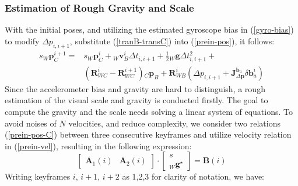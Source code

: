 \documentclass[journal,article,submit,moreauthors,pdftex]{Definitions/mdpi}
\begin{document}
\subsubsection{Estimation of Rough Gravity and Scale}
With the initial poses, and utilizing the estimated gyroscope bias in 
(\ref{gyro-bias}) to modify $\Delta{p}_{i,i+1}$, substitute 
(\ref{tranB-transC}) into (\ref{prein-pos}), it follows:
\begin{equation}
	\begin{aligned}
		s{_W}\boldsymbol{p}_C^{i+1} = & s{_W}\boldsymbol{p}_C^{i} + {_W}\boldsymbol{v}_B^i\Delta{t}_{i,i+1}
		+ \frac{1}{2}{_W}\boldsymbol{g}\Delta{t}_{i,i+1}^2 + \\ & (\boldsymbol{R}_{WC}^i
		-\boldsymbol{R}_{WC}^{i+1}){_C}\boldsymbol{p}_B + 
		\boldsymbol{R}_{WB}^i(\Delta{p}_{i,i+1} +\boldsymbol{J}_{\Delta\boldsymbol{p}}^{\boldsymbol{b}_a}\delta\boldsymbol{b}_a^i)
	\end{aligned}
	\label{prein-pos-C}
\end{equation}
Since the accelerometer bias and gravity are hard to distinguish, a rough estimation 
of the visual scale and gravity is conducted firstly.
The goal to compute the gravity and the scale needs solving a 
linear system of equations. 
To avoid noises of $N$ velocities, and reduce complexity, we consider 
two relations (\ref{prein-pos-C}) between three consecutive keyframes 
and utilize velocity relation in (\ref{prein-vel}), resulting in the 
following expression: 
\begin{equation}
	\left[\begin{matrix} \boldsymbol{A}_1(i) & \boldsymbol{A}_2(i)  \end{matrix}\right] \cdot  
	\left[\begin{matrix} s \\ {_W}\boldsymbol{g}^{\star}  \end{matrix}\right] = \boldsymbol{B}(i)
	\label{VIORough}
\end{equation}
Writing keyframes $i$, $i + 1$, $i + 2$ as 1,2,3 for clarity of 
notation, we have:
\end{document}
